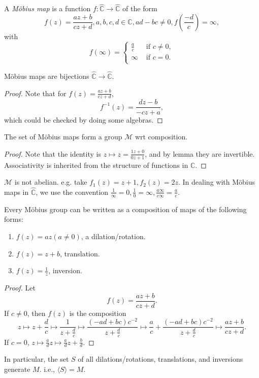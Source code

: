 \documentclass[a4paper]{article}
\begin{document}
\begin{definition}
  A \textit{M\"{o}bius map} is a function $ f: \hat{\mathbb{C}}\to
  \hat{\mathbb{C}} $ of the form
  \[
    f(z)=\frac{az+b}{cz+d}, a,b,c,d\in \mathbb{C}, ad-bc\neq 0,
    f\left( \frac{-d}{c} \right)=\infty
  ,\]
  with
  \[
    f(\infty)=
    \begin{cases}
      \frac{a}{c} &\text{ if } c\neq 0,\\
      \infty &\text{ if } c=0.\\
    \end{cases}
  \]
\end{definition}
\begin{lemma}\label{lma:mobius are bijections}
  M\"{o}bius maps are bijections $ \hat{\mathbb{C}}\to \hat{\mathbb{C}} $.
\end{lemma}
\begin{proof}
  Note that for $ f(z)=\frac{az+b}{cz+d} $,
  \[
    f^{-1}(z)=\frac{dz-b}{-cz+a}
  ,\]
  which could be checked by doing some algebras.
\end{proof}
\begin{theorem}\label{thm:mobius_group}
  The set of M\"{o}bius maps form a group $ \mathcal{M} $ wrt composition.
\end{theorem}
\begin{proof}
  Note that the identity is $z\mapsto z=\frac{1z+0}{0z+1}$, and by
  lemma they are invertible. Associativity  is inherited from the
  structure of functions in $ \mathbb{C} $.
\end{proof}
\begin{remark}
  $\mathcal{M}$ is not abelian. e.g. take $ f_1(z)=z+1, f_2(z)=2z $.
  In dealing with M\"{o}bius maps in $ \hat{\mathbb{C}} $, we use the
  convention $ \frac{1}{\infty}=0, \frac{1}{0}=\infty,
  \frac{a\infty}{c\infty}=\frac{a}{c} $.
\end{remark}
\begin{proposition}\label{prop:decomp_mobius}
  Every M\"{o}bius group can be written as a composition of maps of
  the following forms:
  \begin{enumerate}[(1)]
    \item $ f(z)=az(a\neq 0) $, a dilation/rotation.
    \item $ f(z)=z+b $, translation.
    \item $ f(z)=\frac{1}{z} $, inversion.
  \end{enumerate}
\end{proposition}
\begin{proof}
  Let
  \[
    f(z)=\frac{az+b}{cz+d}
  .\]
  If $c\neq 0$, then $ f(z) $ is the composition
  \[
    z \mapsto z+\frac{d}{c} \mapsto \frac{1}{z+\frac{d}{c}} \mapsto
    \frac{(-ad+bc)c^{-2}}{z+\frac{d}{c}} \mapsto
    \frac{a}{c}+\frac{(-ad+bc)c^{-2}}{z+\frac{d}{c}} \mapsto \frac{az+b}{cz+d}
  .\]
  If $c=0$, $ z \mapsto \frac{a}{d}z \mapsto \frac{a}{d}z+\frac{b}{d}. $
\end{proof}
In particular, the set $S$ of all dilations/rotations, translations,
and inversions generate $M$. i.e., $ \langle S \rangle = M $.
\end{document}
